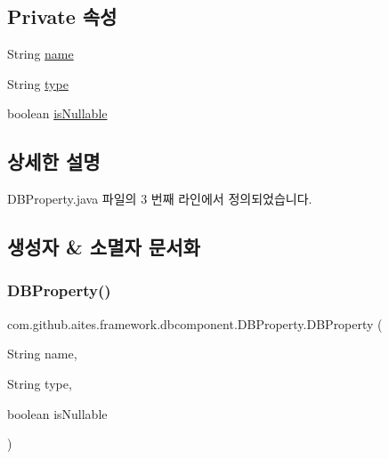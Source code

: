 \subsection*{Private 속성}
\begin{DoxyCompactItemize}
\item 
String \mbox{\hyperlink{classcom_1_1github_1_1aites_1_1framework_1_1dbcomponent_1_1_d_b_property_ada4967ef698663a6b4d30402e6945702}{name}}
\item 
String \mbox{\hyperlink{classcom_1_1github_1_1aites_1_1framework_1_1dbcomponent_1_1_d_b_property_aee1abc4b687abc96bedf9b19d1f52a95}{type}}
\item 
boolean \mbox{\hyperlink{classcom_1_1github_1_1aites_1_1framework_1_1dbcomponent_1_1_d_b_property_a09f366cba7a3b9bc3dfeb0cc2941b964}{is\+Nullable}}
\end{DoxyCompactItemize}


\subsection{상세한 설명}


D\+B\+Property.\+java 파일의 3 번째 라인에서 정의되었습니다.



\subsection{생성자 \& 소멸자 문서화}
\mbox{\label{classcom_1_1github_1_1aites_1_1framework_1_1dbcomponent_1_1_d_b_property_a2bcc24b031bca19286c400a2bdc94538}} 
\subsubsection{\texorpdfstring{D\+B\+Property()}{DBProperty()}}
{\footnotesize\ttfamily com.\+github.\+aites.\+framework.\+dbcomponent.\+D\+B\+Property.\+D\+B\+Property (\begin{DoxyParamCaption}\item[{String}]{name,  }\item[{String}]{type,  }\item[{boolean}]{is\+Nullable }\end{DoxyParamCaption})}




